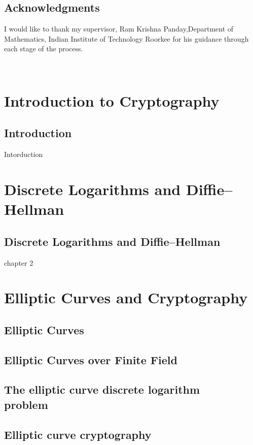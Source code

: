\documentclass[12pt,a4paper]{report}
\begin{document}
	\section*{Acknowledgments}
	I would like to thank my supervisor, Ram Krishna Panday,Department
of Mathematics, Indian Institute of Technology Roorkee for his guidance through each stage of the process. 
	\cleardoublepage	
	
	
	\tableofcontents
	\thispagestyle{empty}
	\cleardoublepage	
	\
	\setcounter{page}{1}
	
	\chapter{Introduction to Cryptography}
	\section{Introduction}
	Intorduction
	\cleardoublepage	
	\chapter{Discrete Logarithms and Diﬃe–Hellman}
	\section{Discrete Logarithms and Diﬃe–Hellman}
	chapter 2
	\cleardoublepage	
	\chapter{Elliptic Curves and Cryptography}
	\section{Elliptic Curves}
	\section{Elliptic Curves over Finite Field}
	\section{The elliptic curve discrete logarithm \\ problem}
	\section{Elliptic curve cryptography}
	\cleardoublepage	
	
	
	
\end{document}
